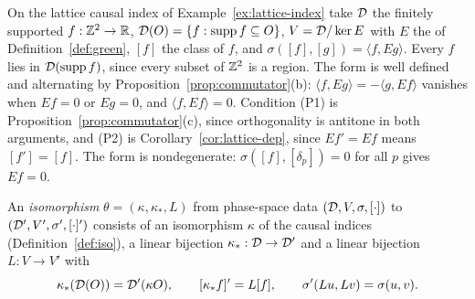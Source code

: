 \begin{extra}
\begin{example}\label{ex:lattice-phase}
On the lattice causal index of Example~\ref{ex:lattice-index} take $\mathcal D$ the finitely supported
$f:\mathbb Z^2\to\mathbb R$, $\mathcal D(O)=\{f:\operatorname{supp} f\subseteq O\}$, $V=\mathcal D/\ker E$ with $E$ the  of
Definition~\ref{def:green}, $[f]$ the class of $f$, and $\sigma([f],[g])=\langle f,Eg\rangle$.
Every $f$ lies in $\mathcal D(\operatorname{supp} f)$, since every subset of $\mathbb Z^2$ is a region.
The form is well defined and alternating by Proposition~\ref{prop:commutator}(b):
$\langle f,Eg\rangle=-\langle g,Ef\rangle$ vanishes when $Ef=0$ or $Eg=0$, and
$\langle f,Ef\rangle=0$. Condition (P1) is Proposition~\ref{prop:commutator}(c), since
orthogonality is antitone in both arguments, and (P2) is Corollary~\ref{cor:lattice-dep}, since
$Ef'=Ef$ means $[f']=[f]$. The form is nondegenerate: 
$\sigma([f],[\delta_p])=0$ for all $p$ gives $Ef=0$.
\end{example}
\end{extra}

\begin{definition}\label{def:phase-iso}
An \emph{isomorphism} $\theta=(\kappa,\kappa_*,L)$ from phase-space data
$(\mathcal D,V,\sigma,[\cdot])$ to $(\mathcal D',V',\sigma',[\cdot]')$ consists of an isomorphism $\kappa$ of
the causal indices (Definition~\ref{def:iso}), a linear bijection $\kappa_*:\mathcal D\to\mathcal D'$ and a
linear bijection $L:V\to V'$ with
\[
\kappa_*(\mathcal D(O))=\mathcal D'(\kappa O),\qquad [\kappa_*f]'=L[f],\qquad \sigma'(Lu,Lv)=\sigma(u,v).
\]
\end{definition}
\noindent{}

